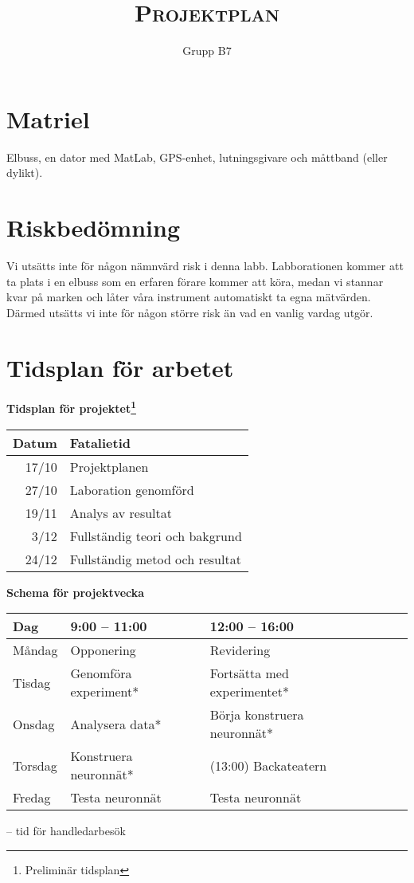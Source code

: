 \documentclass[]{article}
\title{{\huge \textsc{Projektplan}}}
\author{Grupp B7}
\begin{document}
\maketitle
{}
\tableofcontents
\cleardoublepage
{}



\section{Matriel}
Elbuss, en dator med MatLab, GPS-enhet, lutningsgivare och
måttband (eller dylikt).



\section{Riskbedömning}
Vi utsätts inte för någon nämnvärd risk i denna labb.
Labborationen kommer att ta plats i en elbuss som en erfaren förare kommer att köra,
medan vi stannar kvar på marken och låter våra instrument automatiskt ta egna mätvärden.
Därmed utsätts vi inte för någon större risk än vad en vanlig vardag utgör.

\section{Tidsplan för arbetet}
\begin{center}
	{\textbf{Tidsplan för projektet\footnote{Preliminär tidsplan}}} \par
	\begin{tabular}{r | l}
		Datum & Fatalietid \\ \hline
		17/10 & Projektplanen \\
		27/10 & Laboration genomförd \\
		19/11 & Analys av resultat \\
		3/12 & Fullständig teori och bakgrund \\
		24/12 & Fullständig metod och resultat \\
		\hline
	\end{tabular} \par

	\vspace{0.75cm}

	{\textbf{Schema för projektvecka}} \par
	\begin{tabular}{l | l l l l l}
		Dag & 9:00 -- 11:00 & 12:00 -- 16:00 \\ \hline
		Måndag & Opponering & Revidering \\
		Tisdag & Genomföra experiment* & Fortsätta med experimentet* \\
		Onsdag & Analysera data* & Börja konstruera neuronnät* \\
		Torsdag & Konstruera neuronnät* & (13:00) Backateatern \\
		Fredag & Testa neuronnät & Testa neuronnät \\
		\hline
	\end{tabular} \par
	\hfill {\scriptsize * -- tid för handledarbesök}
\end{center}

\clearpage
\printbibliography
\end{document}
